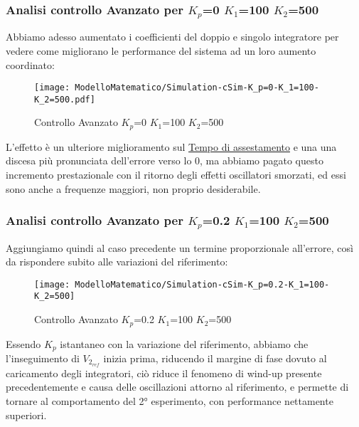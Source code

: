 \subsubsection{Analisi controllo Avanzato per $ K_p $=0 $ K_1 $=100 $ K_2 $=500}
Abbiamo adesso aumentato i coefficienti del doppio e singolo integratore per vedere come migliorano le performance del sistema ad un loro aumento coordinato:
\begin{figure}[H]
	\centering
	\caption[Controllo Avanzato $ K_p $=0 $ K_1 $=100 $ K_2 $=500]{Controllo Avanzato $ K_p $=0 $ K_1 $=100 $ K_2 $=500}
	\texttt{[image: ModelloMatematico/Simulation-cSim-K\_p=0-K\_1=100-K\_2=500.pdf]}
\end{figure}
\noindent
L'effetto è un ulteriore miglioramento sul \underline{Tempo di assestamento} e una una discesa più pronunciata dell'errore verso lo 0, ma abbiamo pagato questo incremento prestazionale con il ritorno degli effetti oscillatori smorzati, ed essi sono anche a frequenze maggiori, non proprio desiderabile.

\newpage

\subsubsection{Analisi controllo Avanzato per $ K_p $=0.2 $ K_1 $=100 $ K_2 $=500}
Aggiungiamo quindi al caso precedente un termine proporzionale all'errore, così da rispondere subito alle variazioni del riferimento:
\begin{figure}[H]
	\centering
	\caption[Controllo Avanzato $ K_p $=0.2 $ K_1 $=100 $ K_2 $=500]{Controllo Avanzato $ K_p $=0.2 $ K_1 $=100 $ K_2 $=500}
	\texttt{[image: ModelloMatematico/Simulation-cSim-K\_p=0.2-K\_1=100-K\_2=500]}
\end{figure}
\noindent
Essendo $ K_p $ istantaneo con la variazione del riferimento, abbiamo che l'inseguimento di $ V_{2_{ref}} $ inizia prima, riducendo il margine di fase dovuto al caricamento degli integratori, ciò riduce il fenomeno di wind-up presente precedentemente e causa delle oscillazioni attorno al riferimento, e permette di tornare al comportamento del 2° esperimento, con performance nettamente superiori.

\newpage

